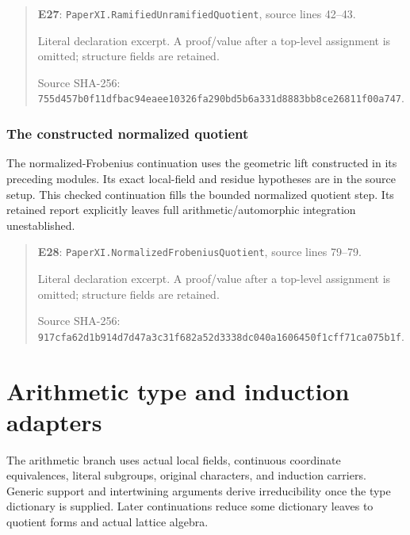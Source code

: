 \documentclass[10pt,oneside]{book}
\begin{document}
\begin{quote}\footnotesize\textbf{E27}: \nolinkurl{PaperXI.RamifiedUnramifiedQuotient}, source lines 42--43.\par Literal declaration excerpt. A proof/value after a top-level assignment is omitted; structure fields are retained.\par Source SHA-256: {\scriptsize\texttt{755d457b0f11dfbac94eaee10326fa290bd5b6a331d8883bb8ce26811f00a747}}.\end{quote}


\subsection{The constructed normalized quotient}
\label{guide:E28}
The normalized-Frobenius continuation uses the geometric lift constructed in its preceding modules. Its exact local-field and residue hypotheses are in the source setup.
This checked continuation fills the bounded normalized quotient step. Its retained report explicitly leaves full arithmetic/automorphic integration unestablished.

\begin{quote}\footnotesize\textbf{E28}: \nolinkurl{PaperXI.NormalizedFrobeniusQuotient}, source lines 79--79.\par Literal declaration excerpt. A proof/value after a top-level assignment is omitted; structure fields are retained.\par Source SHA-256: {\scriptsize\texttt{917cfa62d1b914d7d47a3c31f682a52d3338dc040a1606450f1cff71ca075b1f}}.\end{quote}


\chapter{Arithmetic type and induction adapters}
The arithmetic branch uses actual local fields, continuous coordinate equivalences, literal subgroups, original characters, and induction carriers. Generic support and intertwining arguments derive irreducibility once the type dictionary is supplied. Later continuations reduce some dictionary leaves to quotient forms and actual lattice algebra.
\end{document}
